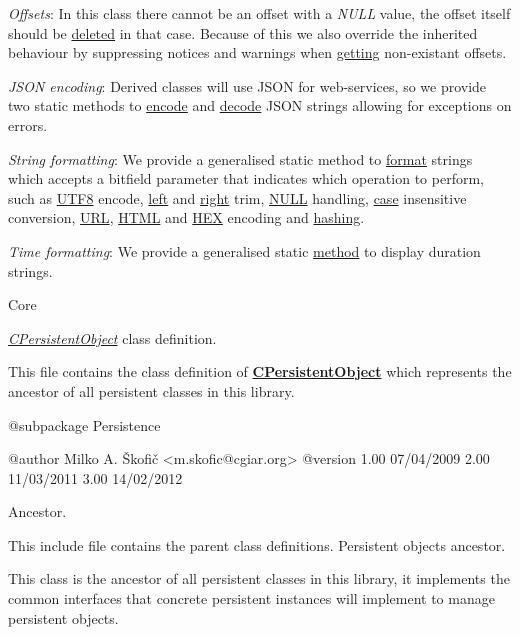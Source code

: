 \begin{DoxyItemize}
\item {\itshape Offsets\/}\-: In this class there cannot be an offset with a {\itshape N\-U\-L\-L\/} value, the offset itself should be \hyperlink{}{deleted} in that case. Because of this we also override the inherited behaviour by suppressing notices and warnings when \hyperlink{}{getting} non-\/existant offsets. 
\item {\itshape J\-S\-O\-N encoding\/}\-: Derived classes will use J\-S\-O\-N for web-\/services, so we provide two static methods to \hyperlink{}{encode} and \hyperlink{}{decode} J\-S\-O\-N strings allowing for exceptions on errors. 
\item {\itshape String formatting\/}\-: We provide a generalised static method to \hyperlink{}{format} strings which accepts a bitfield parameter that indicates which operation to perform, such as \hyperlink{}{U\-T\-F8} encode, \hyperlink{}{left} and \hyperlink{}{right} trim, \hyperlink{}{N\-U\-L\-L} handling, \hyperlink{}{case} insensitive conversion, \hyperlink{}{U\-R\-L}, \hyperlink{}{H\-T\-M\-L} and \hyperlink{}{H\-E\-X} encoding and \hyperlink{}{hashing}. 
\item {\itshape Time formatting\/}\-: We provide a generalised static \hyperlink{}{method} to display duration strings. 
\end{DoxyItemize}

Core

{\itshape \hyperlink{class_c_persistent_object}{C\-Persistent\-Object}\/} class definition.

This file contains the class definition of {\bfseries \hyperlink{class_c_persistent_object}{C\-Persistent\-Object}} which represents the ancestor of all persistent classes in this library.

\begin{DoxyVerb}    @subpackage     Persistence

    @author         Milko A. Škofič <m.skofic@cgiar.org>
    @version        1.00 07/04/2009
                            2.00 11/03/2011
                            3.00 14/02/2012\end{DoxyVerb}


Ancestor.

This include file contains the parent class definitions. Persistent objects ancestor.

This class is the ancestor of all persistent classes in this library, it implements the common interfaces that concrete persistent instances will implement to manage persistent objects.

